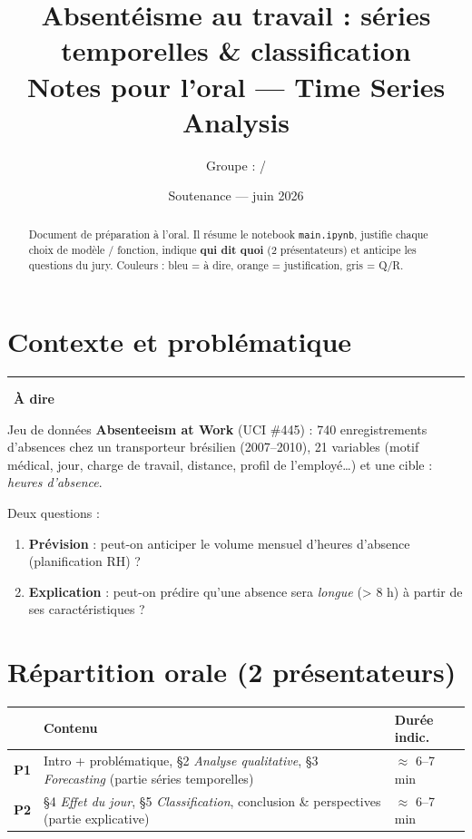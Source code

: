 \documentclass[11pt,a4paper]{article}
\title{\textbf{Absentéisme au travail : séries temporelles \& classification}\\[2mm]
\large Notes pour l'oral --- Time Series Analysis}
\author{Groupe : \underline{\hspace{4cm}} \quad / \quad \underline{\hspace{4cm}}}
\date{Soutenance --- juin 2026}
\newcommand{\code}[1]{\texttt{#1}}
\newenvironment{say}{\par\medskip\noindent\textcolor{blue!45!black}{\rule[-1pt]{3pt}{12pt}}\
  \textbf{\textcolor{blue!45!black}{À dire}}\par\nopagebreak\smallskip\noindent\ignorespaces}{\par\medskip}
\begin{document}
\maketitle

\begin{abstract}
\noindent
Document de préparation à l'oral. Il résume le notebook \code{main.ipynb}, justifie chaque
choix de modèle / fonction, indique \textbf{qui dit quoi} (2 présentateurs) et anticipe les
questions du jury. Couleurs : \colorbox{blue!8}{bleu = à dire}, \colorbox{orange!10}{orange =
justification}, \colorbox{gray!10}{gris = Q/R}.
\end{abstract}

\section{Contexte et problématique}

\begin{say}
Jeu de données \textbf{Absenteeism at Work} (UCI \#445) : 740 enregistrements d'absences chez
un transporteur brésilien (2007--2010), 21 variables (motif médical, jour, charge de travail,
distance, profil de l'employé\dots) et une cible : \emph{heures d'absence}.

Deux questions :
\begin{enumerate}[nosep]
  \item \textbf{Prévision} : peut-on anticiper le volume mensuel d'heures d'absence (planification RH) ?
  \item \textbf{Explication} : peut-on prédire qu'une absence sera \emph{longue} (> 8 h) à partir de ses caractéristiques ?
\end{enumerate}
\end{say}

\section{Répartition orale (2 présentateurs)}

\begin{center}
\begin{tabular}{@{}p{1.3cm}p{8.4cm}p{2.6cm}@{}}
\toprule
& \textbf{Contenu} & \textbf{Durée indic.} \\
\midrule
\textbf{P1} & Intro + problématique, \S2 \emph{Analyse qualitative}, \S3 \emph{Forecasting} (partie séries temporelles) & $\approx$ 6--7 min \\
\textbf{P2} & \S4 \emph{Effet du jour}, \S5 \emph{Classification}, conclusion \& perspectives (partie explicative) & $\approx$ 6--7 min \\
\bottomrule
\end{tabular}
\end{center}
\end{document}
